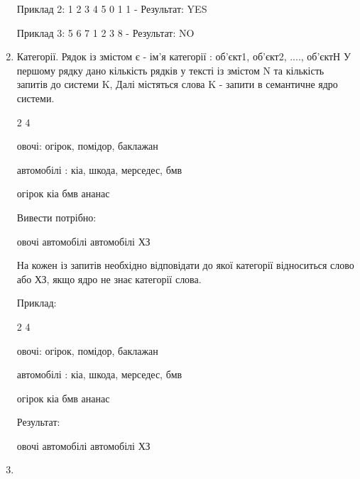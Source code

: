 \documentclass[]{article}
\begin{document}
\begin{enumerate}
Приклад 2: 1 2 3 4 5 0 1 1  - Результат: YES

Приклад 3: 5 6 7 1 2 3 8  - Результат: NO

\item
Категорії.  Рядок із змістом є - ім'я категорії : об'єкт1, об'єкт2, ...., об'єктН
У першому рядку дано кількість рядків у тексті із змістом N та кількість запитів до системи K,
Далі містяться слова K - запити в семантичне ядро ​​системи.

2 4

овочі: огірок, помідор, баклажан

автомобілі : кіа, шкода, мерседес, бмв

огірок кіа бмв ананас

Вивести потрібно:

овочі автомобілі автомобілі ХЗ

На кожен із запитів необхідно відповідати до якої категорії відноситься слово або ХЗ, якщо ядро ​​не знає категорії слова.

Приклад:

2 4

овочі: огірок, помідор, баклажан

автомобілі : кіа, шкода, мерседес, бмв

огірок кіа бмв ананас

Результат:

овочі автомобілі автомобілі ХЗ 

\item

\end{enumerate}
\end{document}
